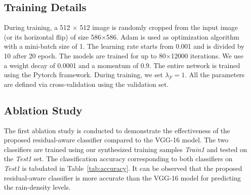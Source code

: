 \documentclass[10pt,twocolumn,letterpaper]{article}
\begin{document}
\subsection{Training Details}
 During training, a 512 $\times$ 512 image is randomly cropped from the input image (or its horizontal flip) of size 586$\times$586. Adam  is used as optimization algorithm with a mini-batch size of 1. The learning rate starts from 0.001 and is divided by 10 after 20 epoch.  The models are trained for up to 80$\times$12000 iterations. We use a weight decay of 0.0001 and a momentum of 0.9. The entire network is trained  using the Pytorch framework. During training, we set $\lambda_F=1$. All the parameters are defined via cross-validation using the validation set. 


\begin{table}
	\centering
	\caption{Quantitative results compared with three baseline configurations on \emph{Test1}.}
	\label{tab:baselinetable}
\end{table}

\subsection{Ablation Study}
The first ablation study is conducted to demonstrate the effectiveness of the proposed residual-aware classifier compared to the VGG-16 \cite{vgg} model. The two classifiers are trained using  our synthesized training samples \emph{Train1} and tested on the \emph{Test1} set. The classification accuracy corresponding to both classifiers on \emph{Test1} is tabulated in Table~\ref{tab:accuracy}. It can be observed that the proposed residual-aware classifier is more accurate than the VGG-16 model for predicting the rain-density levels.
\begin{table}
	\centering
	\caption{Accuracy of rain-density estimation evaluated on \emph{Test1}.}
	\label{tab:accuracy}
\end{table}
\end{document}
